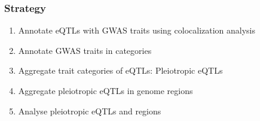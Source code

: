 \documentclass{beamer}
\begin{document}
    \begin{frame}
        \frametitle{Strategy}

        \begin{enumerate}
            \item Annotate eQTLs with GWAS traits using colocalization analysis
            \item Annotate GWAS traits in categories
            \item Aggregate trait categories of eQTLs: Pleiotropic eQTLs
            \item Aggregate pleiotropic eQTLs in genome regions
            \item Analyse pleiotropic eQTLs and regions
        \end{enumerate}
    \end{frame}
\end{document}
